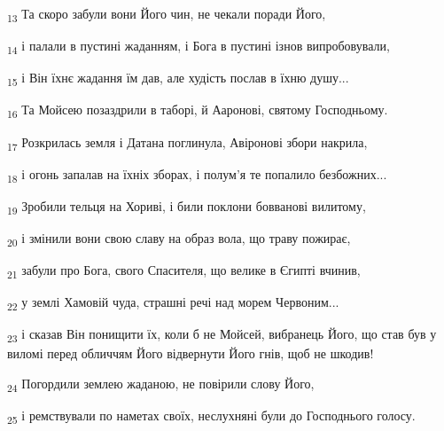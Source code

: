 \begin{tcolorbox}
\textsubscript{13} Та скоро забули вони Його чин, не чекали поради Його,
\end{tcolorbox}
\begin{tcolorbox}
\textsubscript{14} і палали в пустині жаданням, і Бога в пустині ізнов випробовували,
\end{tcolorbox}
\begin{tcolorbox}
\textsubscript{15} і Він їхнє жадання їм дав, але худість послав в їхню душу...
\end{tcolorbox}
\begin{tcolorbox}
\textsubscript{16} Та Мойсею позаздрили в таборі, й Ааронові, святому Господньому.
\end{tcolorbox}
\begin{tcolorbox}
\textsubscript{17} Розкрилась земля і Датана поглинула, Авіронові збори накрила,
\end{tcolorbox}
\begin{tcolorbox}
\textsubscript{18} і огонь запалав на їхніх зборах, і полум'я те попалило безбожних...
\end{tcolorbox}
\begin{tcolorbox}
\textsubscript{19} Зробили тельця на Хориві, і били поклони бовванові вилитому,
\end{tcolorbox}
\begin{tcolorbox}
\textsubscript{20} і змінили вони свою славу на образ вола, що траву пожирає,
\end{tcolorbox}
\begin{tcolorbox}
\textsubscript{21} забули про Бога, свого Спасителя, що велике в Єгипті вчинив,
\end{tcolorbox}
\begin{tcolorbox}
\textsubscript{22} у землі Хамовій чуда, страшні речі над морем Червоним...
\end{tcolorbox}
\begin{tcolorbox}
\textsubscript{23} і сказав Він понищити їх, коли б не Мойсей, вибранець Його, що став був у виломі перед обличчям Його відвернути Його гнів, щоб не шкодив!
\end{tcolorbox}
\begin{tcolorbox}
\textsubscript{24} Погордили землею жаданою, не повірили слову Його,
\end{tcolorbox}
\begin{tcolorbox}
\textsubscript{25} і ремствували по наметах своїх, неслухняні були до Господнього голосу.
\end{tcolorbox}
